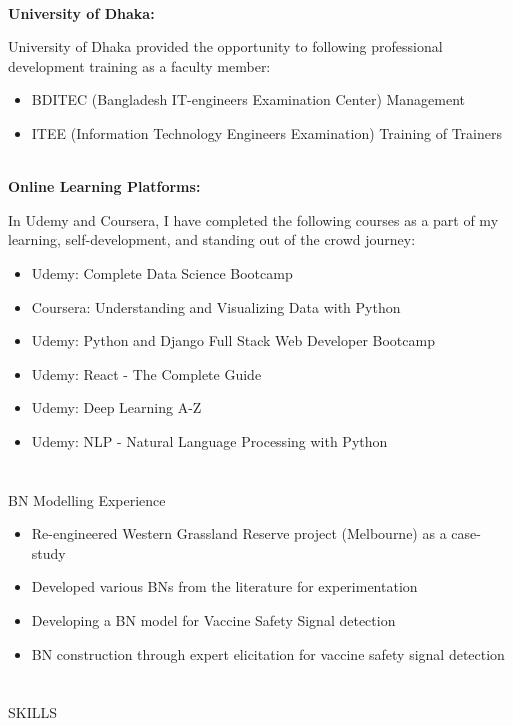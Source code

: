 \documentclass{my_cv}
\begin{document}
\noindent\\
{\bf University of Dhaka:} 

University of Dhaka provided the opportunity to following professional development training as a faculty member:

\begin{itemize}[noitemsep]
    \item BDITEC (Bangladesh IT-engineers Examination Center) Management
    \item ITEE (Information Technology Engineers Examination) Training of Trainers
\end{itemize}

\noindent\\
{\bf Online Learning Platforms:} 

In Udemy and Coursera, I have completed the following courses as a part of my learning, self-development, and standing out of the crowd journey:

\begin{itemize}[noitemsep]
    \item Udemy: Complete Data Science Bootcamp
    \item Coursera: Understanding and Visualizing Data with Python
    \item Udemy: Python and Django Full Stack Web Developer Bootcamp
    \item Udemy: React - The Complete Guide
    \item Udemy: Deep Learning A-Z
    \item Udemy: NLP - Natural Language Processing with Python
\end{itemize}

\section{\faBuilding}{BN Modelling Experience}

\begin{itemize}[noitemsep]
    \item Re-engineered Western Grassland Reserve project (Melbourne) as a case-study
    \item Developed various BNs from the literature for experimentation
    \item Developing a BN model for Vaccine Safety Signal detection
    \item BN construction through expert elicitation for vaccine safety signal detection
\end{itemize}

\section{\faList}{SKILLS}
\end{document}
